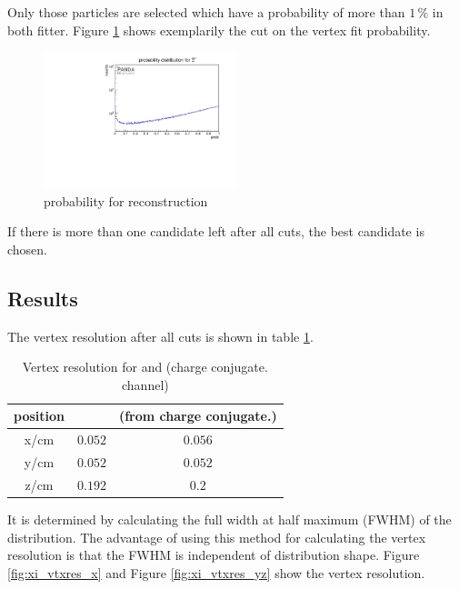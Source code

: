 		Only those particles are selected which have a \chisq probability of more than $1\,\%$ in both fitter. 
		Figure \ref{fig:XiPlus_prob} shows exemplarily the cut on the vertex fit probability.
		
		\begin{figure}
			\centering
				\includegraphics[width=0.50\textwidth]{./plots/Xi/XiPlus_prob.pdf}
			\caption{\propose \chisq probability for \anticascade reconstruction}
			\label{fig:XiPlus_prob}
		\end{figure}
			
		If there is more than one candidate left after all cuts, the best candidate is chosen.
		
		
	\subsection*{Results}
		The vertex resolution after all cuts is shown in table \ref{tab:XiPlus_vtxres}. 
		
		\begin{table}
			\centering
			\caption{\propose Vertex resolution for \anticascade and \cascade (charge conjugate. channel)}
			\label{tab:XiPlus_vtxres}
			\begin{tabular}{ccc}
				\hline
				position & \anticascade & \cascade(from charge conjugate.) \\\hline
				\hline
				x/cm & $0.052$ & $0.056$\\
				y/cm & $0.052$ & $0.052$\\
				z/cm & $0.192$ & $0.2$\\
				\hline
				    
			\end{tabular}
		\end{table}
		
		It is determined by calculating the full width at half maximum (FWHM) of the distribution.
		The advantage of using this method for calculating the vertex resolution is that the FWHM is independent of distribution shape.
		Figure \ref{fig:xi_vtxres_x} and Figure \ref{fig:xi_vtxres_yz} show the vertex resolution. 
		
